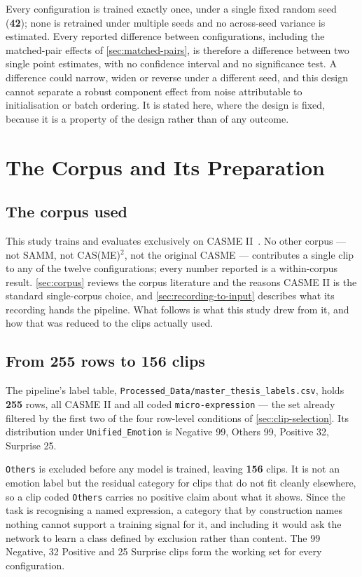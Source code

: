 Every configuration is trained exactly once, under a single fixed random seed (\textbf{42}); none is retrained under multiple seeds and no across-seed variance is estimated. Every reported difference between configurations, including the matched-pair effects of \autoref{sec:matched-pairs}, is therefore a difference between two single point estimates, with no confidence interval and no significance test. A difference could narrow, widen or reverse under a different seed, and this design cannot separate a robust component effect from noise attributable to initialisation or batch ordering. It is stated here, where the design is fixed, because it is a property of the design rather than of any outcome.


\section{The Corpus and Its Preparation}
\label{sec:corpus-preparation}

\subsection{The corpus used}
\label{sec:corpus-used}

This study trains and evaluates exclusively on CASME II~\cite{yan2014}. No other corpus --- not SAMM, not CAS(ME)$^2$, not the original CASME --- contributes a single clip to any of the twelve configurations; every number reported is a within-corpus result. \autoref{sec:corpus} reviews the corpus literature and the reasons CASME II is the standard single-corpus choice, and \autoref{sec:recording-to-input} describes what its recording hands the pipeline. What follows is what this study drew from it, and how that was reduced to the clips actually used.

\subsection{From 255 rows to 156 clips}
\label{sec:255-to-156}

The pipeline's label table, \texttt{Processed\_Data/master\_thesis\_labels.csv}, holds \textbf{255} rows, all CASME II and all coded \texttt{micro-expression} --- the set already filtered by the first two of the four row-level conditions of \autoref{sec:clip-selection}. Its distribution under \texttt{Unified\_Emotion} is Negative 99, Others 99, Positive 32, Surprise 25.

\texttt{Others} is excluded before any model is trained, leaving \textbf{156} clips. It is not an emotion label but the residual category for clips that do not fit cleanly elsewhere, so a clip coded \texttt{Others} carries no positive claim about what it shows. Since the task is recognising a named expression, a category that by construction names nothing cannot support a training signal for it, and including it would ask the network to learn a class defined by exclusion rather than content. The 99 Negative, 32 Positive and 25 Surprise clips form the working set for every configuration.

